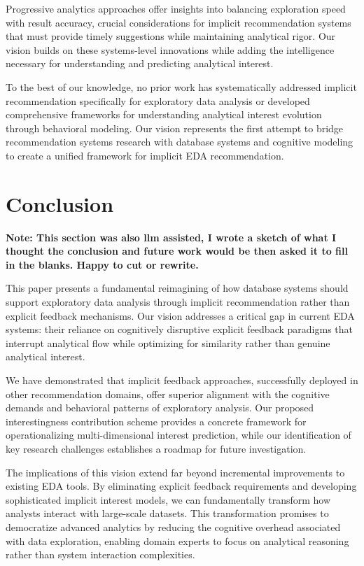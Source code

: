 \documentclass[sigconf, nonacm]{acmart}
\begin{document}
Progressive analytics approaches \cite{fisher2012user, rahman2017i} offer insights into balancing exploration speed with result accuracy, crucial considerations for implicit recommendation systems that must provide timely suggestions while maintaining analytical rigor. Our vision builds on these systems-level innovations while adding the intelligence necessary for understanding and predicting analytical interest.

To the best of our knowledge, no prior work has systematically addressed implicit recommendation specifically for exploratory data analysis or developed comprehensive frameworks for understanding analytical interest evolution through behavioral modeling. Our vision represents the first attempt to bridge recommendation systems research with database systems and cognitive modeling to create a unified framework for implicit EDA recommendation.

\section{Conclusion}

\textbf{Note: This section was also llm assisted, I wrote a sketch of what I thought the conclusion and future work would be then asked it to fill in the blanks. Happy to cut or rewrite.}

This paper presents a fundamental reimagining of how database systems should support exploratory data analysis through implicit recommendation rather than explicit feedback mechanisms. Our vision addresses a critical gap in current EDA systems: their reliance on cognitively disruptive explicit feedback paradigms that interrupt analytical flow while optimizing for similarity rather than genuine analytical interest.

We have demonstrated that implicit feedback approaches, successfully deployed in other recommendation domains, offer superior alignment with the cognitive demands and behavioral patterns of exploratory analysis. Our proposed interestingness contribution scheme provides a concrete framework for operationalizing multi-dimensional interest prediction, while our identification of key research challenges establishes a roadmap for future investigation.

The implications of this vision extend far beyond incremental improvements to existing EDA tools. By eliminating explicit feedback requirements and developing sophisticated implicit interest models, we can fundamentally transform how analysts interact with large-scale datasets. This transformation promises to democratize advanced analytics by reducing the cognitive overhead associated with data exploration, enabling domain experts to focus on analytical reasoning rather than system interaction complexities.
\end{document}
